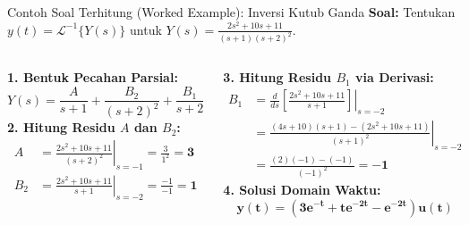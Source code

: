 \documentclass[aspectratio=169,10pt]{beamer}
\begin{document}
\begin{frame}{Contoh Soal Terhitung (Worked Example): Inversi Kutub Ganda}
  \textbf{Soal:} Tentukan $y(t) = \mathcal{L}^{-1}\{Y(s)\}$ untuk $Y(s) = \frac{2s^2 + 10s + 11}{(s + 1)(s + 2)^2}$.
  \vspace{0.15cm}

  \begin{columns}[t]
    \textbf{1. Bentuk Pecahan Parsial:}
    \begin{equation*}
      Y(s) = \frac{A}{s + 1} + \frac{B_2}{(s + 2)^2} + \frac{B_1}{s + 2}
    \end{equation*}
    \textbf{2. Hitung Residu $A$ dan $B_2$:}
    \begin{align*}
      A &= \left. \frac{2s^2 + 10s + 11}{(s + 2)^2} \right|_{s = -1} = \frac{3}{1^2} = \mathbf{3} \\
      B_2 &= \left. \frac{2s^2 + 10s + 11}{s + 1} \right|_{s = -2} = \frac{-1}{-1} = \mathbf{1}
    \end{align*}

    \textbf{3. Hitung Residu $B_1$ via Derivasi:}
    \begin{align*}
      B_1 &= \left. \frac{d}{ds} \left[ \frac{2s^2 + 10s + 11}{s + 1} \right] \right|_{s = -2} \\
          &= \left. \frac{(4s+10)(s+1) - (2s^2+10s+11)}{(s+1)^2} \right|_{s=-2} \\
          &= \frac{(2)(-1) - (-1)}{(-1)^2} = \mathbf{-1}
    \end{align*}
    \textbf{4. Solusi Domain Waktu:}
    \begin{equation*}
      \mathbf{y(t) = \left( 3 e^{-t} + t e^{-2t} - e^{-2t} \right) u(t)}
    \end{equation*}
  \end{columns}
\end{frame}
\end{document}

